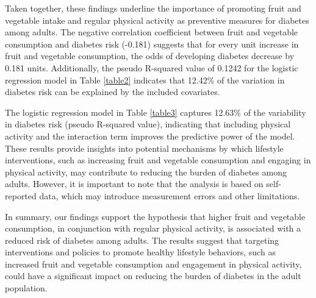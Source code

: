 \documentclass[12pt]{article}
\begin{document}
Taken together, these findings underline the importance of promoting fruit and vegetable intake and regular physical activity as preventive measures for diabetes among adults. The negative correlation coefficient between fruit and vegetable consumption and diabetes risk (-0.181) suggests that for every unit increase in fruit and vegetable consumption, the odds of developing diabetes decrease by 0.181 units. Additionally, the pseudo R-squared value of 0.1242 for the logistic regression model in Table \ref{table2} indicates that 12.42\% of the variation in diabetes risk can be explained by the included covariates.

The logistic regression model in Table \ref{table3} captures 12.63\% of the variability in diabetes risk (pseudo R-squared value), indicating that including physical activity and the interaction term improves the predictive power of the model. These results provide insights into potential mechanisms by which lifestyle interventions, such as increasing fruit and vegetable consumption and engaging in physical activity, may contribute to reducing the burden of diabetes among adults. However, it is important to note that the analysis is based on self-reported data, which may introduce measurement errors and other limitations.

In summary, our findings support the hypothesis that higher fruit and vegetable consumption, in conjunction with regular physical activity, is associated with a reduced risk of diabetes among adults. The results suggest that targeting interventions and policies to promote healthy lifestyle behaviors, such as increased fruit and vegetable consumption and engagement in physical activity, could have a significant impact on reducing the burden of diabetes in the adult population.
\end{document}
